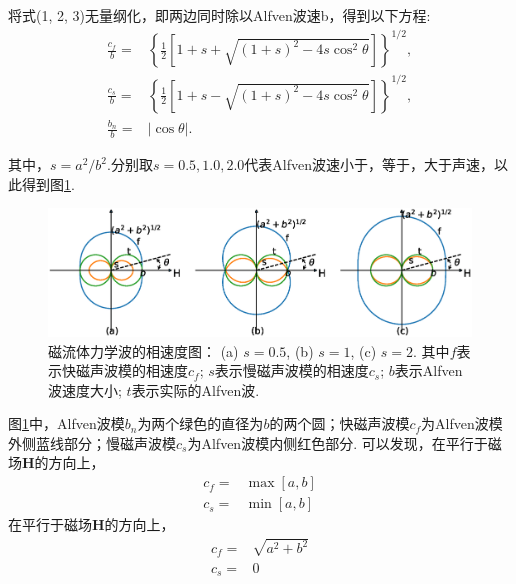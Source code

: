 \documentclass{article}
\begin{document}
    将式(1, 2, 3)无量纲化，即两边同时除以Alfven波速b，得到以下方程\citep{Wang2018}:
    \begin{align}
		\frac{c_f}{b} =& \left\{\frac{1}{2} \left[1 + s + \sqrt{(1 + s)^2 - 4 s
			\cos^2\theta}\right]\right\}^{1/2},
		\\
		\frac{c_s}{b} =& \left\{\frac{1}{2} \left[1 + s - \sqrt{(1 + s)^2 - 4 s
			\cos^2\theta}\right]\right\}^{1/2},
		\\
		\frac{b_n}{b} =& \left|\cos\theta\right|.
	\end{align}	
	
	其中，$s=a^2/b^2$.分别取$s=0.5,1.0,2.0$代表Alfven波速小于，等于，大于声速，以此得到图\ref{Friedrich}.
	
	\begin{figure}[htb]
	\centering
	\includegraphics[width=\textwidth]{figure1.eps}
	\caption{磁流体力学波的相速度图： (a) $s = 0.5$, (b) $s=1$, (c) $s=2$. 其中$f$表示快磁声波模的相速度$c_f$; $s$表示慢磁声波模的相速度$c_s$; $b$表示Alfven波速度大小; $t$表示实际的Alfven波.}\label{Friedrich}
	\end{figure}
    
    图\ref{Friedrich}中，Alfven波模$b_n$为两个绿色的直径为$b$的两个圆；快磁声波模$c_f$为Alfven波模外侧蓝线部分；慢磁声波模$c_s$为Alfven波模内侧红色部分.
    可以发现，在平行于磁场$\boldsymbol{H}$的方向上，
    \begin{align}
      c_f = & \max\left[a , b\right] \\
      c_s = & \min\left[a , b\right]
    \end{align}
    在平行于磁场$\boldsymbol{H}$的方向上，
    \begin{align}
      c_f = & \sqrt{a^2 + b^2} \\
      c_s = & 0
    \end{align}
    
\end{document}
